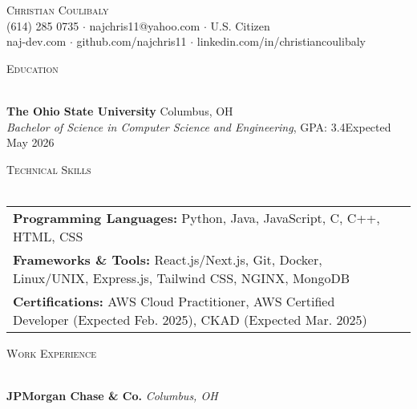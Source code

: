 \documentclass[letterpaper]{article}
\newcommand{\lineunder} {
    \vspace*{-8pt} \\
    \hspace*{-18pt} \hrulefill \\
}
\newcommand{\header} [1] {
    {\hspace*{-18pt}\vspace*{6pt} \textsc{#1}}
    \vspace*{-6pt} \lineunder
}
\begin{document}
\vspace*{-40pt}

\vspace*{-10pt}
\begin{center}
	{\Huge \scshape {Christian Coulibaly}}\\
	(614) 285 0735 $\cdot$ najchris11@yahoo.com $\cdot$ U.S. Citizen \\
    naj-dev.com $\cdot$ github.com/najchris11 $\cdot$ linkedin.com/in/christiancoulibaly\\
\end{center}

\header{Education}
\vspace{1mm}

    \textbf{The Ohio State University} \hfill Columbus, OH\\
    \textit{Bachelor of Science in Computer Science and Engineering}, GPA: 3.4\hfill \hfill Expected May 2026\\
    \vspace{2mm}


\header{Technical Skills}
\vspace{1.5mm}
\hspace{-3mm}
\begin{tabular}{ l l }

    \textbf{Programming Languages:} Python, Java, JavaScript, C, C++, HTML, CSS \\

    \textbf{Frameworks \& Tools:} React.js/Next.js, Git, Docker, Linux/UNIX, Express.js, Tailwind CSS, NGINX, MongoDB  \\

    \textbf{Certifications:} AWS Cloud Practitioner, AWS Certified Developer (Expected Feb. 2025), CKAD (Expected Mar. 2025)  \\

\end{tabular}
\vspace{2mm}

\header{Work Experience}
\vspace{1mm}

    \textbf{JPMorgan Chase \& Co.} \hfill \textsl{Columbus, OH}\\
    
\end{document}
